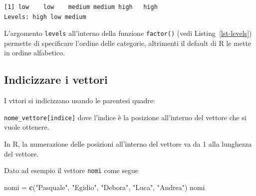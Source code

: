 \documentclass[
  a4paper,
  DIV=11,
  numbers=noendperiod]{scrreprt}
\newenvironment{Shaded}{\begin{snugshade}}{\end{snugshade}}
\newcommand{\AttributeTok}[1]{\textcolor[rgb]{0.13,0.29,0.53}{#1}}
\newcommand{\FunctionTok}[1]{\textcolor[rgb]{0.13,0.29,0.53}{\textbf{#1}}}
\newcommand{\NormalTok}[1]{#1}
\newcommand{\OtherTok}[1]{\textcolor[rgb]{0.56,0.35,0.01}{#1}}
\newcommand{\StringTok}[1]{\textcolor[rgb]{0.31,0.60,0.02}{#1}}
\begin{document}
\begin{verbatim}
[1] low    low    medium medium high   high  
Levels: high low medium
\end{verbatim}

L'argomento \texttt{levels} all'interno della funzione \texttt{factor()}
(vedi Listing~\ref{lst-levels}) permette di specificare l'ordine delle
categorie, altrimenti il default di R le mette in ordine alfabetico.

\begin{codelisting}

\caption{\label{lst-levels}Ordinare i livelli della vraibile con levels}

\centering{

\begin{Shaded}
\begin{Highlighting}[]
\NormalTok{ses }\OtherTok{=} \FunctionTok{factor}\NormalTok{(ses, }\AttributeTok{levels =} \FunctionTok{c}\NormalTok{(}\StringTok{"low"}\NormalTok{, }\StringTok{"medium"}\NormalTok{, }\StringTok{"high"}\NormalTok{))}
\end{Highlighting}
\end{Shaded}

}

\end{codelisting}%

\subsection{Indicizzare i vettori}\label{sec-filterVec}

I vttori si indicizzano usando le parentesi quadre:

\texttt{nome\_vettore{[}indice{]}} dove l'indice è la posizione
all'interno del vettore che si vuole ottenere.

In R, la numerazione delle posizioni all'interno del vettore va da 1
alla lunghezza del vettore.

Dato ad esempio il vettore \texttt{nomi} come segue

\begin{Shaded}
\begin{Highlighting}[]
\NormalTok{nomi }\OtherTok{=} \FunctionTok{c}\NormalTok{(}\StringTok{"Pasquale"}\NormalTok{, }\StringTok{"Egidio"}\NormalTok{, }\StringTok{"Debora"}\NormalTok{, }\StringTok{"Luca"}\NormalTok{, }\StringTok{"Andrea"}\NormalTok{)}
\NormalTok{nomi}
\end{Highlighting}
\end{Shaded}
\end{document}
